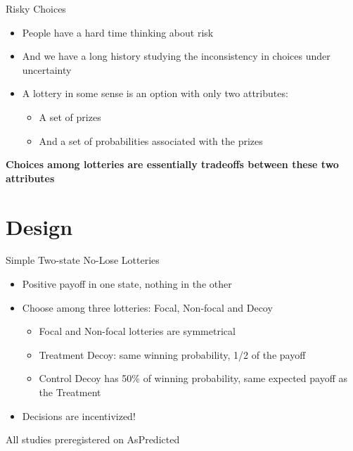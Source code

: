 \documentclass[
  ignorenonframetext,
  aspectratio=169]{beamer}
\begin{document}
\begin{frame}{Risky Choices}
\label{risky-choices}
\begin{itemize}
  \item People have a hard time thinking about risk
  \pause
  \item And we have a long history studying the inconsistency in choices under uncertainty
  \pause
  \item A lottery in some sense is an option with only two attributes: 
  \pause
  \begin{itemize}
    \item A set of prizes
    \item And a set of probabilities associated with the prizes
  \end{itemize}
\end{itemize}

\vfill
\begin{center}
\pause
  \textbf{Choices among lotteries are essentially tradeoffs between these two attributes}
\end{center}
\end{frame}

\section{Design}\label{design}

\begin{frame}{Simple Two-state No-Lose Lotteries}
\label{simple-two-state-no-lose-lotteries}
\begin{itemize}
  \item Positive payoff in one state, nothing in the other
  \pause
  \item Choose among three lotteries: Focal, Non-focal and Decoy
  \begin{itemize}
    \pause
    \item Focal and Non-focal lotteries are symmetrical
    \pause
    \item Treatment Decoy: same winning probability, 1/2 of the payoff
    \pause
    \item Control Decoy has 50\% of winning probability, same expected payoff as the Treatment
  \end{itemize}
  \pause
  \item Decisions are incentivized!
  
\end{itemize}

\vfill

\hfill \tiny *All studies preregistered on AsPredicted
\end{frame}
\end{document}
